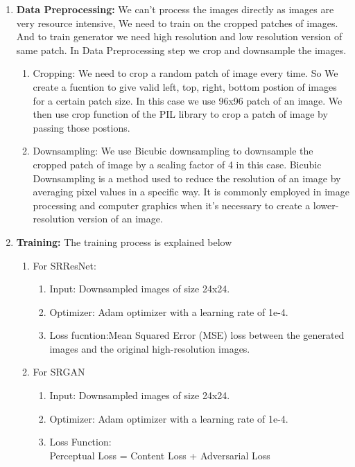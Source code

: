 \begin{enumerate}
    \item {\bf Data Preprocessing:} We can't process the images directly as images are very resource intensive, We need to train on the cropped patches of images. And to train generator we need high resolution and low resolution version of same patch. In Data Preprocessing step we crop and downsample the images. 
    \begin{enumerate}
        \item Cropping: We need to crop a random patch of image every time. So We create a fucntion to give  valid left, top, right, bottom postion of images for a certain patch size. In this case we use 96x96 patch of an image. We then use crop function of the PIL library to crop a patch of image by passing those postions.
        \item Downsampling: We use Bicubic downsampling  to downsample the cropped patch of image by a scaling factor of 4 in this case. Bicubic Downsampling is a method used to reduce the resolution of an image by averaging pixel values in a specific way. It is commonly employed in image processing and computer graphics when it's necessary to create a lower-resolution version of an image.
    \end{enumerate}
    \item {\bf Training:} The training process is explained below
    \begin{enumerate}
        \item For SRResNet:
        \begin{enumerate}
            \item Input: Downsampled images of size 24x24.
            \item Optimizer: Adam optimizer with a learning rate of 1e-4.
            \item Loss fucntion:Mean Squared Error (MSE) loss between the generated images and the original high-resolution images.
        \end{enumerate}
        \item For SRGAN
        \begin{enumerate}
            \item Input: Downsampled images of size 24x24.
            \item Optimizer: Adam optimizer with a learning rate of 1e-4.
            \item Loss Function: \\
            Perceptual Loss = Content Loss + Adversarial Loss
            \begin{itemize}

\end{itemize}
\end{enumerate}
\end{enumerate}
\end{enumerate}

